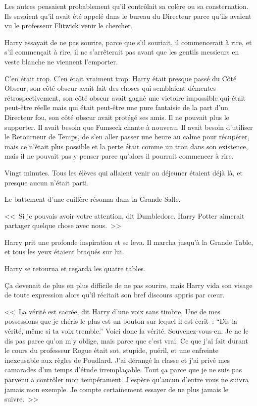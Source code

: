 Les autres pensaient probablement qu'il contrôlait sa colère ou sa consternation. Ils savaient qu'il avait été appelé dans le bureau du Directeur parce qu'ils avaient vu le professeur Flitwick venir le chercher.

Harry essayait de ne pas sourire, parce que s'il souriait, il commencerait à rire, et s'il commençait à rire, il ne s'arrêterait pas avant que les gentils messieurs en veste blanche ne viennent l'emporter.

C'en était trop. C'en était vraiment trop. Harry était presque passé du Côté Obscur, son côté obscur avait fait des choses qui semblaient démentes rétrospectivement, son côté obscur avait gagné une victoire impossible qui était peut-être réelle mais qui était peut-être une pure fantaisie de la part d'un Directeur fou, son côté obscur avait protégé ses amis. Il ne pouvait plus le supporter. Il avait besoin que Fumseck chante à nouveau. Il avait besoin d'utiliser le Retourneur de Temps, de s'en aller passer une heure au calme pour récupérer, mais ce n'était plus possible et la perte était comme un trou dans son existence, mais il ne pouvait pas y penser parce qu'alors il pourrait commencer à rire.

Vingt minutes. Tous les élèves qui allaient venir au déjeuner étaient déjà là, et presque aucun n'était parti.

Le battement d'une cuillère résonna dans la Grande Salle.

<<~Si je pouvais avoir votre attention, dit Dumbledore. Harry Potter aimerait partager quelque chose avec nous.~>>

Harry prit une profonde inspiration et se leva. Il marcha jusqu'à la Grande Table, et tous les yeux étaient braqués sur lui.

Harry se retourna et regarda les quatre tables.

Ça devenait de plus en plus difficile de ne pas sourire, mais Harry vida son visage de toute expression alors qu'il récitait son bref discours appris par cœur.

<<~La vérité est sacrée, dit Harry d'une voix sans timbre. Une de mes possessions que je chéris le plus est un bouton sur lequel il est écrit~: “Dis la vérité, même si ta voix tremble.” Voici donc la vérité. Souvenez-vous-en. Je ne le dis pas parce qu'on m'y oblige, mais parce que c'est vrai. Ce que j'ai fait durant le cours du professeur Rogue était sot, stupide, puéril, et une enfreinte inexcusable aux règles de Poudlard. J'ai dérangé la classe et j'ai privé mes camarades d'un temps d'étude irremplaçable. Tout ça parce que je ne suis pas parvenu à contrôler mon tempérament. J'espère qu'aucun d'entre vous ne suivra jamais mon exemple. Je compte certainement essayer de ne plus jamais le suivre.~>>

